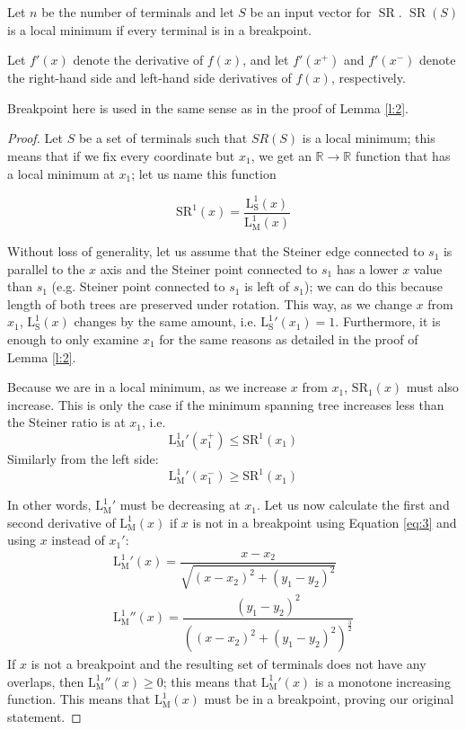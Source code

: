 \documentclass{mpaper}
\begin{document}
\begin{lemma}
  \label{l:1}
  Let $n$ be the number of terminals and let $S$ be an input vector for $\operatorname{SR}$. $\operatorname{SR}(S)$ is a local minimum if every terminal is in a breakpoint.
\end{lemma}
\begin{remark}
  Let $f'(x)$ denote the derivative of $f(x)$, and let $f'(x^+)$ and $f'(x^-)$ denote the right-hand side and left-hand side derivatives of $f(x)$, respectively.

  Breakpoint here is used in the same sense as in the proof of Lemma \ref{l:2}.
\end{remark}
\begin{proof}
  Let $S$ be a set of terminals such that $SR(S)$ is a local minimum; this means that if we fix every coordinate but $x_1$, we get an $\mathbb{R}\rightarrow \mathbb{R}$ function that has a local minimum at $x_1$; let us name this function 
  
  $$\operatorname{SR^1}(x)=\frac{\operatorname{L_S^1}(x)}{\operatorname{L_M^1}(x)}$$
  
  Without loss of generality, let us assume that the Steiner edge connected to $s_1$ is parallel to the $x$ axis and the Steiner point connected to $s_1$ has a lower $x$ value than $s_1$ (e.g. Steiner point connected to $s_1$ is left of $s_1$); we can do this because length of both trees are preserved under rotation. This way, as we change $x$ from $x_1$, $\operatorname{L_S^1}(x)$ changes by the same amount, i.e. $\operatorname{L_S^1}'(x_1)=1$. Furthermore, it is enough to only examine $x_1$ for the same reasons as detailed in the proof of Lemma \ref{l:2}.

  Because we are in a local minimum, as we increase $x$ from $x_1$, $\operatorname{SR_1}(x)$ must also increase. This is only the case if the minimum spanning tree increases less than the Steiner ratio is at $x_1$, i.e.
  \[
    \operatorname{L_M^1}'(x_1^+)\leq\operatorname{SR^1}(x_1)
  \]
  Similarly from the left side:
  \[
    \operatorname{L_M^1}'(x_1^-)\geq\operatorname{SR^1}(x_1)
  \]

  In other words, $\operatorname{L_M^1}'$ must be decreasing at $x_1$. Let us now calculate the first and second derivative of $\operatorname{L_M^1}(x)$ if $x$ is not in a breakpoint using Equation \ref{eq:3} and using $x$ instead of $x_1'$:
  \begin{eqnarray}
    \operatorname{L_M^1}'(x) =\dfrac{x-x_2}{\sqrt{\left(x-x_2\right)^2+\left(y_1-y_2\right)^2}}\\
    \operatorname{L_M^1}''(x) =\dfrac{\left(y_1-y_2\right)^2}{\left(\left(x-x_2\right)^2+\left(y_1-y_2\right)^2\right)^\frac{3}{2}}  
  \end{eqnarray} 
  If $x$ is not a breakpoint and the resulting set of terminals does not have any overlaps, then $\operatorname{L_M^1}''(x)\geq 0$; this means that  $\operatorname{L_M^1}'(x)$ is a monotone increasing function. This means that $\operatorname{L_M^1}(x)$ must be in a breakpoint, proving our original statement.
\end{proof}
\end{document}
